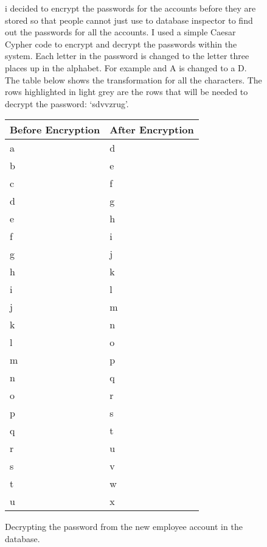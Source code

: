 \begin{figure}[H]
    \caption{Decrypting the password from the new employee account in the database.} \label{fig:test-307-3}

\vspace{5mm}
  i decided to encrypt the passwords for the accounts before they are stored so that people cannot just use to database inspector to find out the passwords for all the accounts. I used a simple Caesar Cypher code to encrypt and decrypt the passwords within the system. Each letter in the password is changed to the letter three places up in the alphabet. For example and A is changed to a D. The table below shows the transformation for all the characters. The rows highlighted in light grey are the rows that will be needed to decrypt the password: `sdvvzrug'.

\vspace{5mm}
\begin{center}
\begin{tabular}{|p{3.5cm}|p{3.5cm}|}
        \hline
        \textbf{Before Encryption} & \textbf{After Encryption} \\ \hline
       \rowcolor{light-grey} a & d \\ \hline
        b & e\\ \hline
        c & f\\ \hline
       \rowcolor{light-grey} d & g\\ \hline
        e & h\\ \hline
        f & i\\ \hline
        g & j\\ \hline
        h & k\\ \hline
        i & l\\ \hline
        j & m\\ \hline
        k & n\\ \hline
        l & o\\ \hline
        m & p\\ \hline
        n & q\\ \hline
       \rowcolor{light-grey} o & r\\ \hline
       \rowcolor{light-grey}p & s\\ \hline
       q & t\\ \hline
      \rowcolor{light-grey}  r & u\\ \hline
      \rowcolor{light-grey}  s & v\\ \hline
        t & w\\ \hline
        u & x\\ \hline

\end{tabular}
\end{center}
\end{figure}
